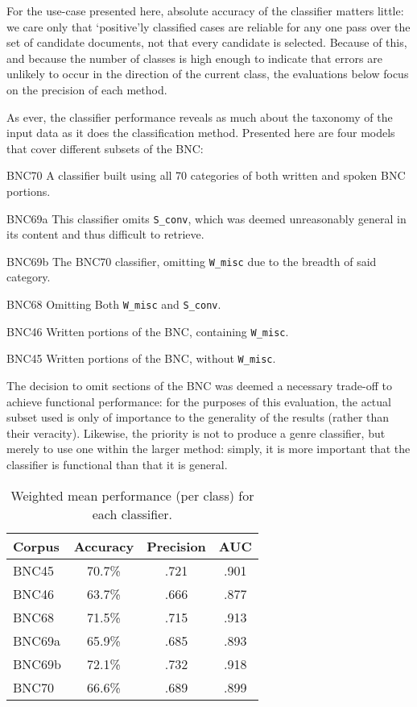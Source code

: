 For the use-case presented here, absolute accuracy of the classifier matters little: we care only that `positive'ly classified cases are reliable for any one pass over the set of candidate documents, not that every candidate is selected.  Because of this, and because the number of classes is high enough to indicate that errors are unlikely to occur in the direction of the current class, the evaluations below focus on the precision of each method.

As ever, the classifier performance reveals as much about the taxonomy of the input data as it does the classification method.  Presented here are four models that cover different subsets of the BNC:

\begin{itemizeTitle}
    \item[BNC70] A classifier built using all 70 categories of both written and spoken BNC portions.
    \item[BNC69a] This classifier omits \texttt{S\_conv}, which was deemed unreasonably general in its content and thus difficult to retrieve.
    \item[BNC69b] The BNC70 classifier, omitting \texttt{W\_misc} due to the breadth of said category.
    \item[BNC68] Omitting Both \texttt{W\_misc} and \texttt{S\_conv}.
    \item[BNC46] Written portions of the BNC, containing \texttt{W\_misc}.
    \item[BNC45] Written portions of the BNC, without \texttt{W\_misc}.
\end{itemizeTitle}

The decision to omit sections of the BNC was deemed a necessary trade-off to achieve functional performance: for the purposes of this evaluation, the actual subset used is only of importance to the generality of the results (rather than their veracity).  Likewise, the priority is not to produce a genre classifier, but merely to use one within the larger method: simply, it is more important that the classifier is functional than that it is general.

\begin{table}[ht]
    \centering

    \begin{tabular}{ |l|c|c|c| }
        \hline 
        Corpus & Accuracy & Precision & AUC \\
        \hline
        BNC45  &  70.7\%  &  .721  &  .901 \\
        BNC46  &  63.7\%  &  .666  &  .877 \\
        BNC68  &  71.5\%  &  .715  &  .913 \\
        BNC69a &  65.9\%  &  .685  &  .893 \\
        BNC69b &  72.1\%  &  .732  &  .918 \\
        BNC70  &  66.6\%  &  .689  &  .899 \\
        \hline
    \end{tabular}
    \caption{Weighted mean performance (per class) for each classifier.}
    \label{table:evaluation:heuristics:classifieraccuracy}
\end{table}

